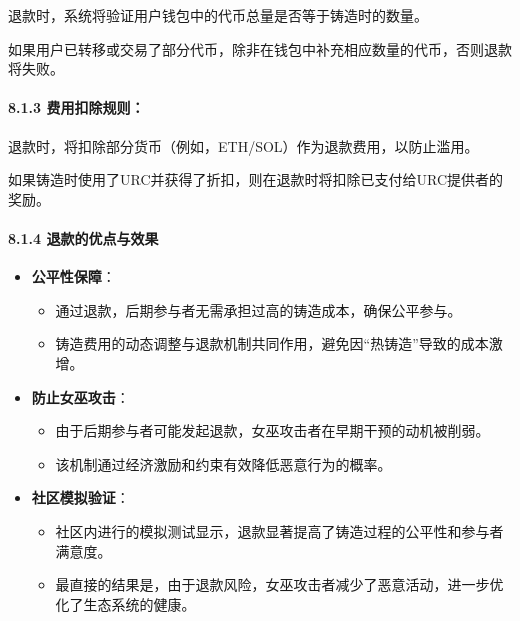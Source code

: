 \documentclass[
]{article}
\providecommand{\tightlist}{%
  \setlength{\itemsep}{0pt}\setlength{\parskip}{0pt}}
\begin{document}
退款时，系统将验证用户钱包中的代币总量是否等于铸造时的数量。

如果用户已转移或交易了部分代币，除非在钱包中补充相应数量的代币，否则退款将失败。

\paragraph{8.1.3
费用扣除规则：}\label{ux8d39ux7528ux6263ux9664ux89c4ux5219}

退款时，将扣除部分货币（例如，ETH/SOL）作为退款费用，以防止滥用。

如果铸造时使用了URC并获得了折扣，则在退款时将扣除已支付给URC提供者的奖励。

\paragraph{8.1.4
退款的优点与效果}\label{ux9000ux6b3eux7684ux4f18ux70b9ux4e0eux6548ux679c}

\begin{itemize}
\tightlist
\item
  \textbf{公平性保障}：

  \begin{itemize}
  \tightlist
  \item
    通过退款，后期参与者无需承担过高的铸造成本，确保公平参与。
  \item
    铸造费用的动态调整与退款机制共同作用，避免因``热铸造''导致的成本激增。
  \end{itemize}
\item
  \textbf{防止女巫攻击}：

  \begin{itemize}
  \tightlist
  \item
    由于后期参与者可能发起退款，女巫攻击者在早期干预的动机被削弱。
  \item
    该机制通过经济激励和约束有效降低恶意行为的概率。
  \end{itemize}
\item
  \textbf{社区模拟验证}：

  \begin{itemize}
  \tightlist
  \item
    社区内进行的模拟测试显示，退款显著提高了铸造过程的公平性和参与者满意度。
  \item
    最直接的结果是，由于退款风险，女巫攻击者减少了恶意活动，进一步优化了生态系统的健康。
  \end{itemize}
\end{itemize}
\end{document}
